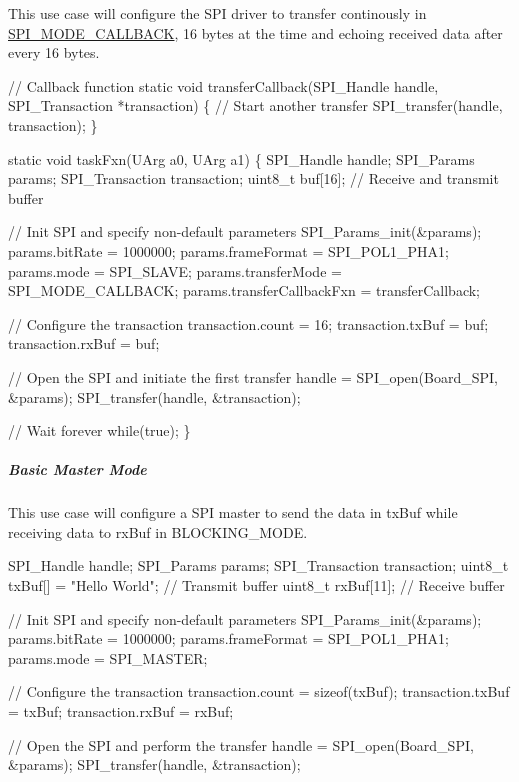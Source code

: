 This use case will configure the S\+P\+I driver to transfer continously in \hyperlink{_s_p_i_8h_ab9ea76c6529d6076eee5e1c4a5a92c6fa5631e69925c47a62a261c78ebbda39fb}{S\+P\+I\+\_\+\+M\+O\+D\+E\+\_\+\+C\+A\+L\+L\+B\+A\+C\+K}, 16 bytes at the time and echoing received data after every 16 bytes. 
\begin{DoxyCode}
\textcolor{comment}{// Callback function}
\textcolor{keyword}{static} \textcolor{keywordtype}{void} transferCallback(SPI_Handle handle, SPI_Transaction *transaction)
\{
    \textcolor{comment}{// Start another transfer}
    SPI_transfer(handle, transaction);
\}

\textcolor{keyword}{static} \textcolor{keywordtype}{void} taskFxn(UArg a0, UArg a1)
\{
    SPI_Handle handle;
    SPI_Params params;
    SPI_Transaction transaction;
    uint8\_t buf[16];                  \textcolor{comment}{// Receive and transmit buffer}

    \textcolor{comment}{// Init SPI and specify non-default parameters}
    SPI_Params_init(&params);
    params.bitRate             = 1000000;
    params.frameFormat         = SPI_POL1_PHA1;
    params.mode                = SPI_SLAVE;
    params.transferMode        = SPI_MODE_CALLBACK;
    params.transferCallbackFxn = transferCallback;

    \textcolor{comment}{// Configure the transaction}
    transaction.count = 16;
    transaction.txBuf = buf;
    transaction.rxBuf = buf;

    \textcolor{comment}{// Open the SPI and initiate the first transfer}
    handle = SPI_open(Board\_SPI, &params);
    SPI_transfer(handle, &transaction);

    \textcolor{comment}{// Wait forever}
    \textcolor{keywordflow}{while}(\textcolor{keyword}{true});
\}
\end{DoxyCode}


\subparagraph*{Basic Master Mode}

This use case will configure a S\+P\+I master to send the data in tx\+Buf while receiving data to rx\+Buf in B\+L\+O\+C\+K\+I\+N\+G\+\_\+\+M\+O\+D\+E. 
\begin{DoxyCode}
SPI_Handle handle;
SPI_Params params;
SPI_Transaction transaction;
uint8\_t txBuf[] = \textcolor{stringliteral}{"Hello World"};    \textcolor{comment}{// Transmit buffer}
uint8\_t rxBuf[11];                  \textcolor{comment}{// Receive buffer}

\textcolor{comment}{// Init SPI and specify non-default parameters}
SPI_Params_init(&params);
params.bitRate     = 1000000;
params.frameFormat = SPI_POL1_PHA1;
params.mode        = SPI_MASTER;

\textcolor{comment}{// Configure the transaction}
transaction.count = \textcolor{keyword}{sizeof}(txBuf);
transaction.txBuf = txBuf;
transaction.rxBuf = rxBuf;

\textcolor{comment}{// Open the SPI and perform the transfer}
handle = SPI_open(Board\_SPI, &params);
SPI_transfer(handle, &transaction);
\end{DoxyCode}


